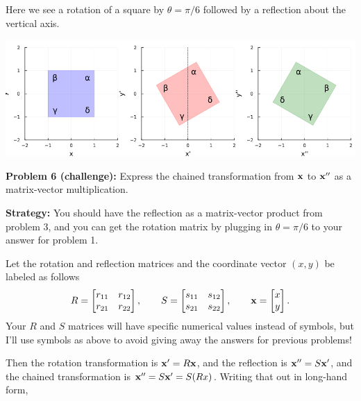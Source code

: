 \documentclass[letter]{article}
\newcommand{\bx}{{\bf x}}
\begin{document}
Here we see a rotation of a square by $\theta = \pi/6$ followed by a reflection
about the vertical axis.

\begin{center}
\includegraphics[width=\textwidth]{chained-transformation-1.png}
\end{center}

\vspace{4mm}
{\bf Problem 6 (challenge):} Express the chained transformation from $\bx$ to $\bx''$
as a matrix-vector multiplication. 

\vspace{4mm}
{\bf Strategy:}
You should have the reflection as a matrix-vector product from problem 3,
and you can get the rotation matrix by plugging in $\theta = \pi/6$ to your
answer for problem 1.

\vspace{4mm}
Let the rotation and reflection matrices and the coordinate vector $(x,y)$ be labeled
as follows
\begin{align*}
  R = \begin{bmatrix} r_{11} & r_{12} \\ r_{21} & r_{22} \end{bmatrix}, \quad \quad
  S = \begin{bmatrix} s_{11} & s_{12} \\ s_{21} & s_{22} \end{bmatrix}, \quad \quad
  \bx = \begin{bmatrix} x \\ y \end{bmatrix}.                                                                                                
\end{align*}
Your $R$ and $S$ matrices will have specific numerical values instead of symbols, but I'll
use symbols as above to avoid giving away the answers for previous problems! 
  
\vspace{4mm}
Then the rotation transformation is $\bx' = R \bx$, and the reflection is $\bx'' = S \bx'$,
and the chained transformation is $\bx'' = S \bx' = S(Rx)$. Writing that out in long-hand form,
\end{document}
